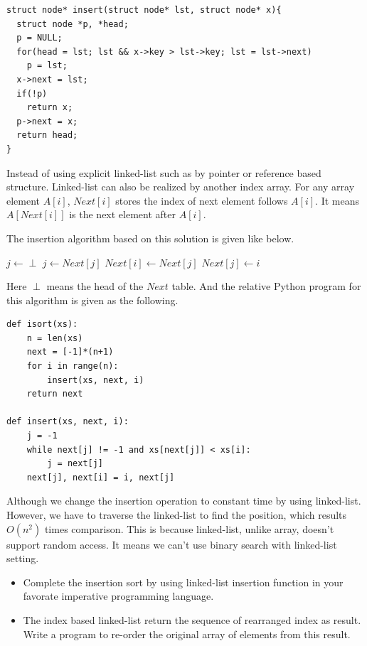 \documentclass{article}
\begin{document}
\begin{lstlisting}
struct node* insert(struct node* lst, struct node* x){
  struct node *p, *head;
  p = NULL;
  for(head = lst; lst && x->key > lst->key; lst = lst->next)
    p = lst;
  x->next = lst;
  if(!p)
    return x;
  p->next = x;
  return head;
}
\end{lstlisting}

Instead of using explicit linked-list such as by pointer or reference
based structure. Linked-list can also be realized by another index array.
For any array element $A[i]$, $Next[i]$ stores the index of next element
follows $A[i]$. It means $A[Next[i]]$ is the next element after $A[i]$.

The insertion algorithm based on this solution is given like below.

\begin{algorithmic}
  \State $j \gets \perp$
    \State $j \gets Next[j]$
  \EndWhile
  \State $Next[i] \gets Next[j]$
  \State $Next[j] \gets i$
\EndFunction
\end{algorithmic}

Here $\perp$ means the head of the $Next$ table.
And the relative Python program for this algorithm is given as the following.

\lstset{language=Python}
\begin{lstlisting}
def isort(xs):
    n = len(xs)
    next = [-1]*(n+1)
    for i in range(n):
        insert(xs, next, i)
    return next

def insert(xs, next, i):
    j = -1
    while next[j] != -1 and xs[next[j]] < xs[i]:
        j = next[j]
    next[j], next[i] = i, next[j]
\end{lstlisting}

Although we change the insertion operation to constant time by using
linked-list. However, we have to traverse the linked-list to find the
position, which results $O(n^2)$ times comparison. This is because
linked-list, unlike array, doesn't support random access. It means we
can't use binary search with linked-list setting.

\begin{Exercise}
\begin{itemize}
\item Complete the insertion sort by using linked-list insertion function
in your favorate imperative programming language.
\item The index based linked-list return the sequence of rearranged index
as result. Write a program to re-order the original array of elements from
this result.
\end{itemize}
\end{Exercise}
\end{document}
